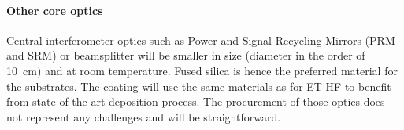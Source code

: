 








\paragraph{Other core optics}

Central interferometer optics such as Power and Signal Recycling Mirrors (PRM and SRM) or beamsplitter will be smaller in size (diameter in the order of 10~cm) and at room temperature. Fused silica is hence the preferred material for the substrates. The coating will use the same materials as for ET-HF to benefit from state of the art deposition process. The procurement of those optics does not represent any challenges and will be straightforward.